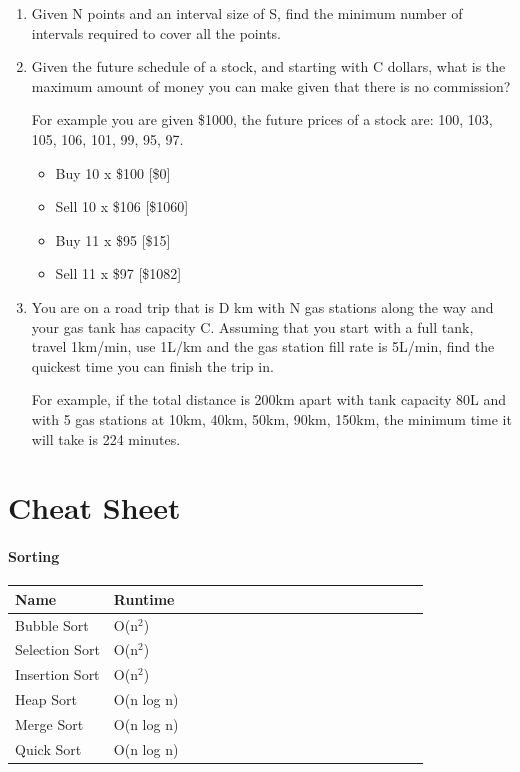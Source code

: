 \documentclass[11pt,oneside]{book}
\begin{document}
\begin{enumerate}
\item Given N points and an interval size of S, find the minimum number of intervals required to cover all the points.
\item Given the future schedule of a stock, and starting with C dollars, what is the maximum amount of money you can make given that there is no commission?

For example you are given \$1000, the future prices of a stock are: 100, 103, 105, 106, 101, 99, 95, 97.

\begin{itemize}
\item Buy 10 x \$100 [\$0]
\item Sell 10 x \$106 [\$1060]
\item Buy 11 x \$95 [\$15]
\item Sell 11 x \$97 [\$1082]
\end{itemize}
\item You are on a road trip that is D km with N gas stations along the way and your gas tank has capacity C. Assuming that you start with a full tank, travel 1km/min, use 1L/km and the gas station fill rate is 5L/min, find the quickest time you can finish the trip in.

For example, if the total distance is 200km apart with tank capacity 80L and with 5 gas stations at 10km, 40km, 50km, 90km, 150km, the minimum time it will take is 224 minutes.
\end{enumerate}


  \appendix
  \chapter{Cheat Sheet}\subsubsection{Sorting}

\begin{center}\begin{tabulary}{0.4\linewidth}{|l|l|l|l|l|l|l|l|l|l|l|l|l|l|l|l|l|l|l}\hline


  Name &
  Runtime\\
\hline


  Bubble Sort &
  O(n$^{2}$)\\

  Selection Sort &
  O(n$^{2}$)\\

  Insertion Sort &
  O(n$^{2}$)\\

  Heap Sort &
  O(n log n)\\

  Merge Sort &
  O(n log n)\\

  Quick Sort &
  O(n log n)\\

\hline\end{tabulary}\end{center}
\end{document}
